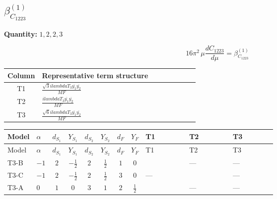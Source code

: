 \documentclass[8pt]{article}
\begin{document}
\begin{landscape}
\section*{$\beta_{C_{1223}}^{(1)}$}
\noindent\textbf{Quantity: }$\mathrm{1,2,2,3}$\par\smallskip
\[16\pi^2\,\mu\frac{d C_{1223}}{d\mu}=\beta_{C_{1223}}^{(1)}\]
\begin{center}
\begin{tabular}{@{}c >{\raggedright\arraybackslash}p{0.82\linewidth}@{}}
\toprule
Column & Representative term structure \\
\midrule
T1 & \(\displaystyle \frac{\sqrt{3} i lambdaT_{3} \overline{y_{1}} \overline{y_{2}}}{MF}\) \\
\midrule
T2 & \(\displaystyle \frac{i lambdaT_{3} \overline{y_{1}} \overline{y_{2}}}{MF}\) \\
\midrule
T3 & \(\displaystyle \frac{\sqrt{6} i lambdaT_{3} \overline{y_{1}} \overline{y_{2}}}{MF}\) \\
\midrule
\bottomrule
\end{tabular}
\end{center}
\smallskip
\tiny
\begin{longtable}{@{}llcccccc >{\raggedright\arraybackslash}p{0.21\linewidth} >{\raggedright\arraybackslash}p{0.21\linewidth} >{\raggedright\arraybackslash}p{0.21\linewidth}@{}}
\toprule
Model & $\alpha$ & $d_{S_1}$ & $Y_{S_1}$ & $d_{S_2}$ & $Y_{S_2}$ & $d_F$ & $Y_F$ & T1 & T2 & T3 \\
\midrule
\endfirsthead
\toprule
Model & $\alpha$ & $d_{S_1}$ & $Y_{S_1}$ & $d_{S_2}$ & $Y_{S_2}$ & $d_F$ & $Y_F$ & T1 & T2 & T3 \\
\midrule
\endhead
T3-B & $-1$ & $2$ & $-\frac{1}{2}$ & $2$ & $\frac{1}{2}$ & $1$ & $0$ & \scriptsize\adjustbox{max width=\linewidth}{$\begin{gathered} - \frac{\sqrt{3} i lambdaT_{3} \overline{y_{1}} \overline{y_{2}}}{3 MF}\end{gathered}$} & --- & --- \\
\midrule
T3-C & $-1$ & $2$ & $-\frac{1}{2}$ & $2$ & $\frac{1}{2}$ & $3$ & $0$ & --- & \scriptsize\adjustbox{max width=\linewidth}{$\begin{gathered} \frac{i lambdaT_{3} \overline{y_{1}} \overline{y_{2}}}{3 MF}\end{gathered}$} & --- \\
\midrule
T3-A & $0$ & $1$ & $0$ & $3$ & $1$ & $2$ & $\frac{1}{2}$ & \scriptsize\adjustbox{max width=\linewidth}{$\begin{gathered} - \frac{\sqrt{3} i lambdaT_{3} \overline{y_{1}} \overline{y_{2}}}{3 MF}\end{gathered}$} & --- & --- \\

\end{longtable}
\end{landscape}
\end{document}
